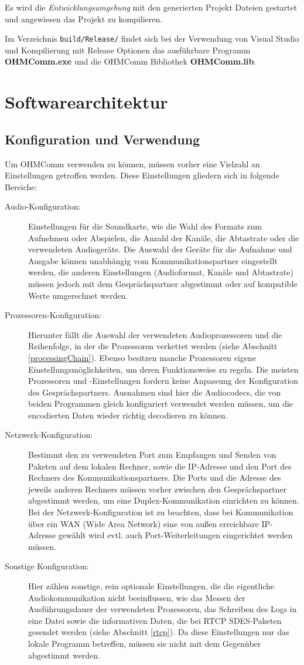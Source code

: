 Es wird die \textit{Entwicklungsumgebung} mit den generierten Projekt Dateien gestartet und angewiesen das Projekt zu kompilieren.

Im Verzeichnis \texttt{build/Release/} findet sich bei der Verwendung von Visual Studio und Kompilierung mit Release Optionen das ausführbare Programm \textbf{OHMComm.exe} und die OHMComm Bibliothek \textbf{OHMComm.lib}.

\section{Softwarearchitektur}
\subsection{Konfiguration und Verwendung}
\label{configurationUsages}
Um OHMComm verwenden zu können, müssen vorher eine Vielzahl an Einstellungen getroffen werden. Diese Einstellungen gliedern sich in folgende Bereiche:
\begin{description}
\item[Audio-Konfiguration:]Einstellungen für die Soundkarte, wie die Wahl des Formats zum Aufnehmen oder Abspielen, die Anzahl der Kanäle, die Abtastrate oder die verwendeten Audiogeräte. Die Auswahl der Geräte für die Aufnahme und Ausgabe können unabhängig vom Kommunikationspartner eingestellt werden, die anderen Einstellungen (Audioformat, Kanäle und Abtastrate) müssen jedoch mit dem Gesprächspartner abgestimmt oder auf kompatible Werte umgerechnet werden.
\item[Prozessoren-Konfiguration:]Hierunter fällt die Auswahl der verwendeten Audioprozessoren und die Reihenfolge, in der die Prozessoren verkettet werden (siehe Abschnitt \ref{processingChain}). Ebenso besitzen manche Prozessoren eigene Einstellungsmöglichkeiten, um deren Funktionsweise zu regeln. Die meisten Prozessoren und -Einstellungen fordern keine Anpassung der Konfiguration des Gesprächspartners. Ausnahmen sind hier die Audiocodecs, die von beiden Programmen gleich konfiguriert verwendet werden müssen, um die encodierten Daten wieder richtig decodieren zu können.
\item[Netzwerk-Konfiguration:]Bestimmt den zu verwendeten Port zum Empfangen und Senden von Paketen auf dem lokalen Rechner, sowie die IP-Adresse und den Port des Rechners des Kommunikationspartners. Die Ports und die Adresse des jeweils anderen Rechners müssen vorher zwischen den Gesprächspartner abgestimmt werden, um eine Duplex-Kommunikation einrichten zu können. Bei der Netzwerk-Konfiguration ist zu beachten, dass bei Kommunikation über ein WAN (Wide Area Network) eine von außen erreichbare IP-Adresse gewählt wird evtl. auch Port-Weiterleitungen eingerichtet werden müssen.
\item[Sonstige Konfiguration:] Hier zählen sonstige, rein optionale Einstellungen, die die eigentliche Audiokommunikation nicht beeinflussen, wie das Messen der Ausführungsdauer der verwendeten Prozessoren, das Schreiben des Logs in eine Datei sowie die informativen Daten, die bei RTCP SDES-Paketen gesendet werden (siehe Abschnitt \ref{rtcp}). Da diese Einstellungen nur das lokale Programm betreffen, müssen sie nicht mit dem Gegenüber abgestimmt werden.
\end{description}

